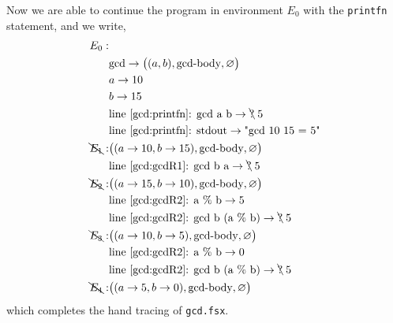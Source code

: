 Now we are able to continue the program in environment $E_0$ with the \lstinline!printfn! statement, and we write,
\begin{align*}
  E_0:&\\
      & \text{gcd} \rightarrow \big((a, b), \text{gcd-body}, \varnothing\big)\\
      & a \rightarrow 10\\
      & b \rightarrow 15\\
      & \text{line~\ref{gcd:printfn}: gcd a b} \rightarrow \bcancel{\text{?}}\; 5\\
      & \text{line~\ref{gcd:printfn}: stdout} \rightarrow \text{"gcd 10 15 = 5"}\\
  \bcancel{E_1}:& \big((a \rightarrow 10, b \rightarrow 15), \text{gcd-body}, \varnothing\big)\\
      & \text{line~\ref{gcd:gcdR1}: gcd b a} \rightarrow \bcancel{\text{?}}\; 5\\
  \bcancel{E_2}:& \big((a \rightarrow 15, b \rightarrow 10), \text{gcd-body}, \varnothing\big)\\
      & \text{line~\ref{gcd:gcdR2}: a \% b} \rightarrow 5\\
      & \text{line~\ref{gcd:gcdR2}: gcd b (a \% b)} \rightarrow \bcancel{\text{?}}\; 5\\
  \bcancel{E_3}:& \big((a \rightarrow 10, b \rightarrow 5), \text{gcd-body}, \varnothing\big)\\
      & \text{line~\ref{gcd:gcdR2}: a \% b} \rightarrow 0\\
      & \text{line~\ref{gcd:gcdR2}: gcd b (a \% b)} \rightarrow \bcancel{\text{?}}\; 5\\
  \bcancel{E_4}:& \big((a \rightarrow 5, b \rightarrow 0), \text{gcd-body}, \varnothing\big)\\
\end{align*}
which completes the hand tracing of \lstinline[language=console]{gcd.fsx}.

